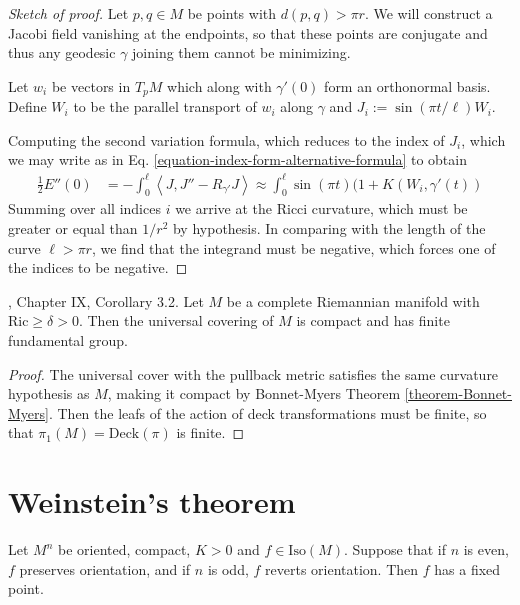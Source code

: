 \begin{proof}[Sketch of proof]
Let $p,q \in M$ be points with $d(p,q)>\pi r$. We will construct a Jacobi
field vanishing at the endpoints, so that these points are conjugate and thus
any geodesic $\gamma$ joining them cannot be minimizing.

Let $w_i$ be vectors in $T_pM$ which along with $\gamma'(0)$ form an orthonormal
basis. Define $W_i$ to be the parallel transport of $w_i$ along $\gamma$ and
$J_i:=\sin(\pi t/\ell)W_i$.

Computing the second variation formula, which reduces to the index of $J_i$,
which we may write as in Eq. \ref{equation-index-form-alternative-formula} to
obtain
\begin{align*}
\frac{1}{2}E''(0)&=-\int_0^\ell\left<J,J''-R_{\gamma'}J\right>
\approx\int_0^\ell \sin(\pi t)(1+K(W_i,\gamma'(t))
\end{align*}
Summing over all indices $i$ we arrive at the Ricci curvature, which must be
greater or equal than $1/r^2$ by hypothesis. In comparing with the length of the
curve $\ell>\pi r$, we find that the integrand must be
negative, which forces one of the indices to be negative.
\end{proof}

\begin{lemma}
\label{lemma-Bonnet-Myers-implies-compact-universal-covering-and-finite-pi1}
\cite{doc}, Chapter IX, Corollary 3.2. Let $M$ be a complete Riemannian manifold
with $\text{Ric}\geq \delta>0$. Then the universal covering of $M$ is compact
and has finite fundamental group.
\end{lemma}

\begin{proof}
The universal cover with the pullback metric satisfies the same curvature
hypothesis as $M$, making it compact by Bonnet-Myers Theorem
\ref{theorem-Bonnet-Myers}. Then the leafs of the action of deck transformations
must be finite, so that $\pi_1(M)=\text{Deck}(\pi)$ is finite.
\end{proof}


\section{Weinstein's theorem}
\label{section-Weinstein-theorem}

\begin{theorem}[Weinstein]
\label{theorem-Weinstein}
Let $M^n$ be oriented, compact, $K>0$ and $f \in \text{Iso}(M)$. Suppose that 
if $n$ is even, $f$ preserves orientation, and if $n$ is odd, $f$ reverts
orientation. Then $f$ has a fixed point.
\end{theorem}

